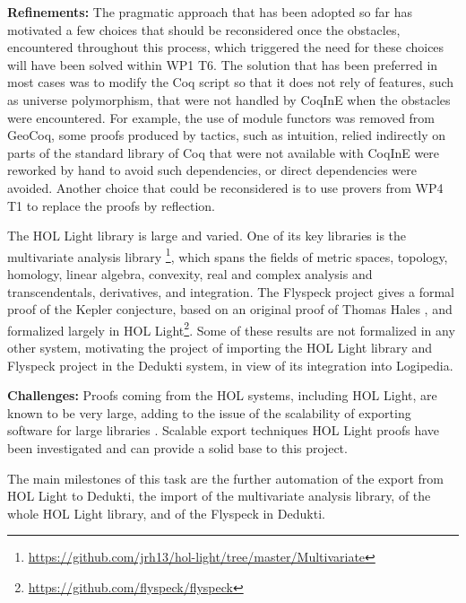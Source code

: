 \begin{workpackage}[id=libraries,wphases=0-48,type=RTD,
  short=Libraries,%
  title=Libraries,
  lead=Inr,
  InrRM=10,
  TumRM=42]
\begin{tasklist}
\begin{task}[id=geocoq,title=The GeoCoq library]
\textbf{Refinements:}
The pragmatic approach that has been adopted so far has motivated a few choices that should be reconsidered once the obstacles, encountered throughout this process, which triggered the need for these choices will have been solved within WP1 T6. The solution that has been preferred in most cases was to modify the Coq script so that it does not rely of features, such as universe polymorphism, that were not handled by CoqInE when the obstacles were encountered. For example, the use of module functors was removed from GeoCoq, some proofs produced by tactics, such as intuition, relied indirectly on parts of the standard library of Coq that were not available with CoqInE were reworked by hand to avoid such dependencies, or direct dependencies were avoided. Another choice that could be reconsidered is to use provers from WP4 T1 to replace the proofs by reflection.
\end{task}

\begin{task}[id=flyspeck,title=The Flyspeck library]
The {HOL Light} library is large and varied. One of its key libraries is the 
multivariate analysis 
library
\footnote{\url{https://github.com/jrh13/hol-light/tree/master/Multivariate}},
which spans the fields of metric spaces, topology, homology, linear algebra,
convexity, real and complex analysis and transcendentals, derivatives, and
integration. The {Flyspeck} project gives a formal proof of the {Kepler}
conjecture, based on an original proof of Thomas {Hales} 
\cite{DBLP:journals/corr/HalesABDHHKMMNNNOPRSTTTUVZ15}, and formalized
largely in {HOL Light}\footnote{\url{https://github.com/flyspeck/flyspeck}}.
Some of these results are not formalized in any other system, motivating the 
project of importing the {HOL Light} library and {Flyspeck} project in the 
{Dedukti} system, in view of its integration into {Logipedia}.

\textbf{Challenges:}
Proofs coming from the HOL systems, including {HOL Light}, are known to be very 
large, adding to the issue of the scalability of exporting software for large 
libraries \cite{DBLP:conf/tphol/Wong95,DBLP:conf/cade/ObuaS06,
DBLP:conf/itp/KellerW10,DBLP:conf/cade/Kumar13}. Scalable export techniques 
{HOL Light} proofs have been investigated \cite{KaliszykK13} and can provide a 
solid base to this project.

The main milestones of this task are the further automation of the export from 
{HOL Light} to {Dedukti}, the import of the multivariate analysis library, of 
the whole {HOL Light} library, and of the {Flyspeck} in {Dedukti}.
\end{task}


\end{tasklist}
\end{workpackage}
